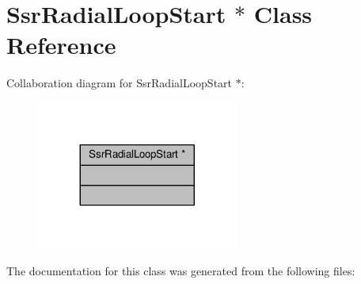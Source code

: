 \hypertarget{classSsrRadialLoopStart_01_5}{}\section{Ssr\+Radial\+Loop\+Start $\ast$ Class Reference}
\label{classSsrRadialLoopStart_01_5}


Collaboration diagram for Ssr\+Radial\+Loop\+Start $\ast$\+:\nopagebreak
\begin{figure}[H]
\begin{center}
\leavevmode
\includegraphics[width=188pt]{classSsrRadialLoopStart_01_5__coll__graph}
\end{center}
\end{figure}


The documentation for this class was generated from the following files\+: